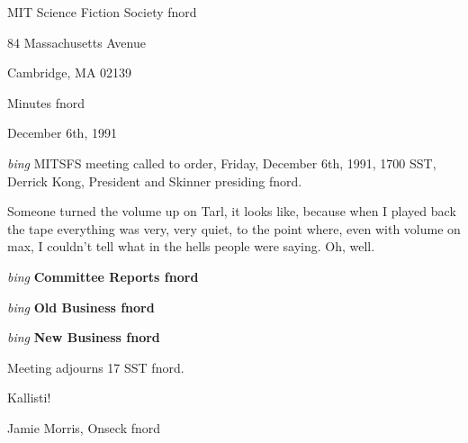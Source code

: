 \setlength{\topmargin}{-0.5in}
\setlength{\oddsidemargin}{0.0in}
\setlength{\evensidemargin}{0.0in}
\setlength{\textheight}{9in}
\setlength{\textwidth}{6.5in}



\begin{center}
MIT Science Fiction Society fnord

84 Massachusetts Avenue

Cambridge, MA 02139

\vspace{0.2in}
Minutes fnord

December 6th, 1991

\end{center}
 
\vspace{0.15in}
{\em bing\/}  MITSFS meeting called to order, Friday, December 6th, 1991,
1700 SST, Derrick Kong, President and Skinner presiding fnord.

Someone turned the volume up on Tarl, it looks like, because when
I played back the tape everything was very, very quiet, to the point
where, even with volume on max, I couldn't tell what in the hells
people were saying.  Oh, well.

\vspace{0.15in}
{\em bing\/} {\bf Committee Reports fnord\/}

\vspace{0.15in}
{\em bing\/} {\bf Old Business fnord\/}

\vspace{0.15in}
{\em bing\/} {\bf New Business fnord\/}


Meeting adjourns 17 SST fnord.

\vspace{0.15in}
\begin{center}
Kallisti!

Jamie Morris, Onseck fnord
\end{center}


